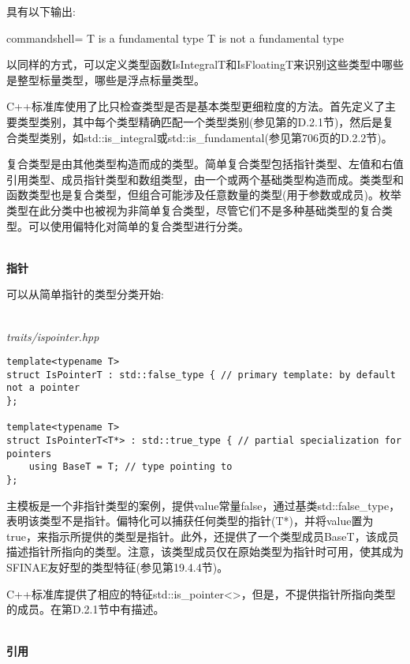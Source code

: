 具有以下输出:

\begin{tcblisting}{commandshell={}}
T is a fundamental type
T is not a fundamental type
\end{tcblisting}

以同样的方式，可以定义类型函数IsIntegralT和IsFloatingT来识别这些类型中哪些是整型标量类型，哪些是浮点标量类型。

C++标准库使用了比只检查类型是否是基本类型更细粒度的方法。首先定义了主要类型类别，其中每个类型精确匹配一个类型类别(参见第的D.2.1节)，然后是复合类型类别，如std::is\_integral或std::is\_fundamental(参见第706页的D.2.2节)。


复合类型是由其他类型构造而成的类型。简单复合类型包括指针类型、左值和右值引用类型、成员指针类型和数组类型，由一个或两个基础类型构造而成。类类型和函数类型也是复合类型，但组合可能涉及任意数量的类型(用于参数或成员)。枚举类型在此分类中也被视为非简单复合类型，尽管它们不是多种基础类型的复合类型。可以使用偏特化对简单的复合类型进行分类。

\hspace*{\fill} \\ %
\noindent
\textbf{指针}

可以从简单指针的类型分类开始:

\hspace*{\fill} \\ %
\noindent
\textit{traits/ispointer.hpp}
\begin{lstlisting}[style=styleCXX]
template<typename T>
struct IsPointerT : std::false_type { // primary template: by default not a pointer
};

template<typename T>
struct IsPointerT<T*> : std::true_type { // partial specialization for pointers
	using BaseT = T; // type pointing to
};
\end{lstlisting}

主模板是一个非指针类型的案例，提供value常量false，通过基类std::false\_type，表明该类型不是指针。偏特化可以捕获任何类型的指针(T*)，并将value置为true，来指示所提供的类型是指针。此外，还提供了一个类型成员BaseT，该成员描述指针所指向的类型。注意，该类型成员仅在原始类型为指针时可用，使其成为SFINAE友好型的类型特征(参见第19.4.4节)。

C++标准库提供了相应的特征std::is\_pointer<>，但是，不提供指针所指向类型的成员。在第D.2.1节中有描述。

\hspace*{\fill} \\ %
\noindent
\textbf{引用}


